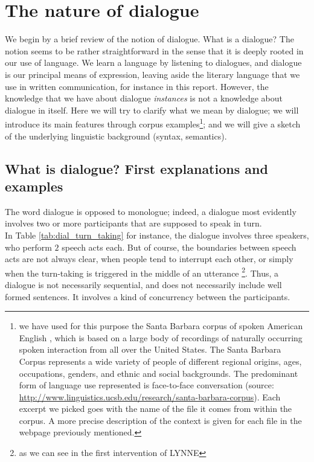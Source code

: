 \documentclass[11pt]{article}
\begin{document}
	\section{The nature of dialogue}
		We begin by a brief review of the notion of dialogue. What is a dialogue? The notion seems to be rather straightforward in the sense that it is deeply rooted in our use of language. We learn a language by listening to dialogues, and dialogue is our principal means of expression, leaving aside the literary language that we use in written communication, for instance in this report. However, the knowledge that we have about dialogue \textit{instances} is not a knowledge about dialogue in itself. Here we will try to clarify what we mean by dialogue; we will introduce its main features through corpus examples\footnote{we have used for this purpose the Santa Barbara corpus of spoken American English \cite{dubois2000}, which is based on a large body of recordings of naturally occurring spoken interaction from all over the United States. The Santa Barbara Corpus represents a wide variety of people of different regional origins, ages, occupations, genders, and ethnic and social backgrounds. The predominant form of language use represented is face-to-face conversation (source: \href{http://www.linguistics.ucsb.edu/research/santa-barbara-corpus}{http://www.linguistics.ucsb.edu/research/santa-barbara-corpus}). Each excerpt we picked goes with the name of the file it comes from within the corpus. A more precise description of the context is given for each file in the webpage previously mentioned.}; and we will give a sketch of the underlying linguistic background (syntax, semantics).
		\subsection{What is dialogue? First explanations and examples}
			The word dialogue is opposed to monologue; indeed, a dialogue most evidently involves two or more participants that are supposed to speak in turn.\\
			
			In Table \ref{tab:dial_turn_taking} for instance, the dialogue involves three speakers, who perform $2$ speech acts each. But of course, the boundaries between speech acts are not always clear, when people tend to interrupt each other, or simply when the turn-taking is triggered in the middle of an utterance \footnote{as we can see in the first intervention of LYNNE}. Thus, a dialogue is not necessarily sequential, and does not necessarily include well formed sentences. It involves a kind of concurrency between the participants.
			
\end{document}

